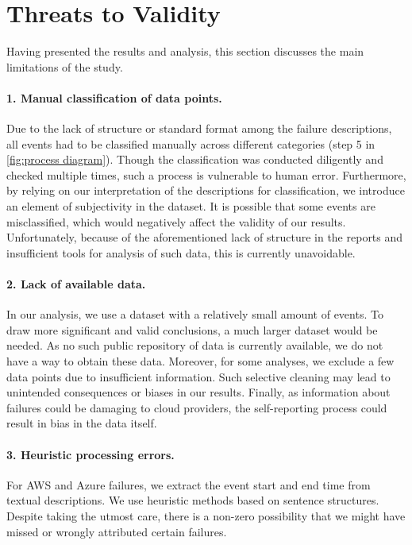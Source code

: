 \section{Threats to Validity}
Having presented the results and analysis, this section discusses the main limitations of the study.

\paragraph{1. Manual classification of data points.}
Due to the lack of structure or standard format among the failure descriptions, all events had to be classified manually across different categories (step 5 in \autoref{fig:process diagram}).
Though the classification was conducted diligently and checked multiple times, such a process is vulnerable to human error.
Furthermore, by relying on our interpretation of the descriptions for classification, we introduce an element of subjectivity in the dataset.
It is possible that some events are misclassified, which would negatively affect the validity of our results.
Unfortunately, because of the aforementioned lack of structure in the reports and insufficient tools for analysis of such data, this is currently unavoidable.

\paragraph{2. Lack of available data.}
In our analysis, we use a dataset with a relatively small amount of events.
To draw more significant and valid conclusions, a much larger dataset would be needed.
As no such public repository of data is currently available, we do not have a way to obtain these data.
Moreover, for some analyses, we exclude a few data points due to insufficient information.
Such selective cleaning may lead to unintended consequences or biases in our results.
Finally, as information about failures could be damaging to cloud providers, the self-reporting process could result in bias in the data itself.

\paragraph{3. Heuristic processing errors.}
For AWS and Azure failures, we extract the event start and end time from textual descriptions.
We use heuristic methods based on sentence structures.
Despite taking the utmost care, there is a non-zero possibility that we might have missed or wrongly attributed certain failures.
